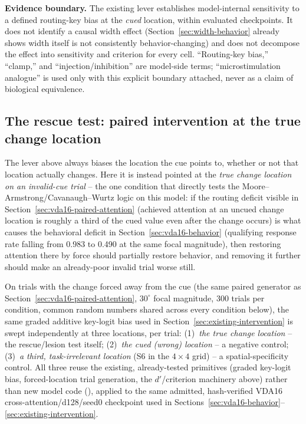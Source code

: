 \documentclass[11pt,a4paper]{article}
\newcommand{\boundary}[1]{\par\smallskip\noindent\colorbox{VdaLight}{\parbox{0.96\linewidth}{\textbf{Evidence boundary.} #1}}\par\smallskip}
\begin{document}
\boundary{The existing lever establishes model-internal sensitivity to a defined routing-key bias at the \emph{cued} location, within evaluated checkpoints. It does not identify a causal width effect (Section~\ref{sec:width-behavior} already shows width itself is not consistently behavior-changing) and does not decompose the effect into sensitivity and criterion for every cell. ``Routing-key bias,'' ``clamp,'' and ``injection/inhibition'' are model-side terms; ``microstimulation analogue'' is used only with this explicit boundary attached, never as a claim of biological equivalence.}

\subsection{The rescue test: paired intervention at the true change location}\label{sec:pending-intervention}
The lever above always biases the location the cue points to, whether or not that location actually changes. Here it is instead pointed at the \emph{true change location on an invalid-cue trial} -- the one condition that directly tests the Moore--Armstrong/Cavanaugh--Wurtz logic on this model: if the routing deficit visible in Section~\ref{sec:vda16-paired-attention} (achieved attention at an uncued change location is roughly a third of the cued value even after the change occurs) is what causes the behavioral deficit in Section~\ref{sec:vda16-behavior} (qualifying response rate falling from 0.983 to 0.490 at the same focal magnitude), then restoring attention there by force should partially restore behavior, and removing it further should make an already-poor invalid trial worse still.

On trials with the change forced away from the cue (the same paired generator as Section~\ref{sec:vda16-paired-attention}, $30^\circ$ focal magnitude, 300 trials per condition, common random numbers shared across every condition below), the same graded additive key-logit bias used in Section~\ref{sec:existing-intervention} is swept independently at three locations, per trial: (1)~\emph{the true change location} -- the rescue/lesion test itself; (2)~\emph{the cued (wrong) location} -- a negative control; (3)~\emph{a third, task-irrelevant location} (S6 in the $4\times4$ grid) -- a spatial-specificity control. All three reuse the existing, already-tested primitives (graded key-logit bias, forced-location trial generation, the $d'$/criterion machinery above) rather than new model code (), applied to the same admitted, hash-verified VDA16 cross-attention/d128/seed0 checkpoint used in Sections~\ref{sec:vda16-behavior}--\ref{sec:existing-intervention}.
\end{document}
